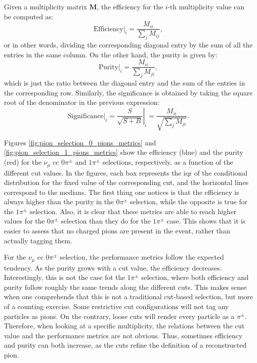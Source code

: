 Given a multiplicity matrix $\mathbf{M}$, the efficiency for the $i$-th multiplicity value can be computed as:
\begin{equation}\label{eq:efficiency_matrix}
    \left.\mathrm{Efficiency}\right|_{i} = \frac{M_{ii}}{\sum_{j} M_{ij}},
\end{equation}
or in other words, dividing the corresponding diagonal entry by the sum of all the entries in the same column. On the other hand, the purity is given by:
\begin{equation}\label{eq:purity_matrix}
    \left.\mathrm{Purity}\right|_{i} = \frac{M_{ii}}{\sum_{j} M_{ji}},
\end{equation}
which is just the ratio between the diagonal entry and the sum of the entries in the corresponding row. Similarly, the significance is obtained by taking the square root of the denominator in the previous expression:
\begin{equation}\label{eq:significance_matrix}
    \left.\mathrm{Significance}\right|_{i} = \left.\frac{S}{\sqrt{S+B}}\right|_{i} = \frac{M_{ii}}{\sqrt{\sum_{j} M_{ji}}}.
\end{equation}

Figures \ref{fig:pion_selection_0_pions_metrics} and \ref{fig:pion_selection_1_pions_metrics} show the efficiency (blue) and the purity (red) for the $\nu_{\mu}$ \gls{cc} $0\pi^{\pm}$ and $1\pi^{\pm}$ selections, respectively, as a function of the different cut values. In the figures, each box represents the \gls{iqr} of the conditional distribution for the fixed value of the corresponding cut, and the horizontal lines correspond to the medians. The first thing one notices is that the efficiency is always higher than the purity in the $0\pi^{\pm}$ selection, while the opposite is true for the $1\pi^{\pm}$ selection. Also, it is clear that these metrics are able to reach higher values for the $0\pi^{\pm}$ selection than they do for the $1\pi^{\pm}$ case. This shows that it is easier to assess that no charged pions are present in the event, rather than actually tagging them.

For the $\nu_{\mu}$ \gls{cc} $0\pi^{\pm}$ selection, the performance metrics follow the expected tendency. As the purity grows with a cut value, the efficiency decreases. Interestingly, this is not the case fot the $1\pi^{\pm}$ selection, where both efficiency and purity follow roughly the same trends along the different cuts. This makes sense when one comprehends that this is not a traditional cut-based selection, but more of a counting exercise. Some restrictive cut configurations will not tag any particles as pions. On the contrary, loose cuts will render every particle as a $\pi^{\pm}$. Therefore, when looking at a specific multiplicity, the relations between the cut value and the performance metrics are not obvious. Thus, sometimes efficiency and purity can both increase, as the cuts refine the definition of a reconstructed pion.

